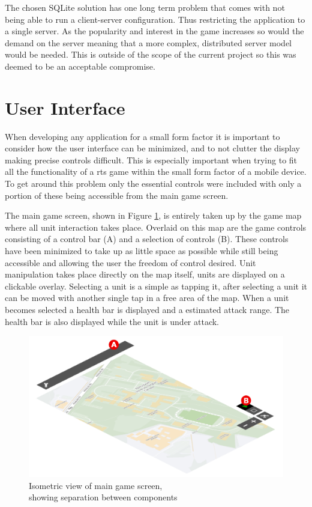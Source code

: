 The chosen SQLite solution has one long term problem that comes with not being able to run a client-server configuration. Thus restricting the application to a single server. As the popularity and interest in the game increases so would the demand on the server meaning that a more complex, distributed server model would be needed. This is outside of the scope of the current project so this was deemed to be an acceptable compromise.

\section{User Interface}
When developing any application for a small form factor it is important to consider how the user interface can be minimized, and to not clutter the display making precise controls difficult. This is especially important when trying to fit all the functionality of a \gls{rts} game within the small form factor of a mobile device. To get around this problem only the essential controls were included with only a portion of these being accessible from the main game screen.

The main game screen, shown in Figure \ref{fig:isogui}, is entirely taken up by the game map where all unit interaction takes place. Overlaid on this map are the game controls consisting of a control bar (A) and a selection of controls (B). These controls have been minimized to take up as little space as possible while still being accessible and allowing the user the freedom of control desired. Unit manipulation takes place directly on the map itself, units are displayed on a clickable overlay. Selecting a unit is a simple as tapping it, after selecting a unit it can be moved with another single tap in a free area of the map. When a unit becomes selected a health bar is displayed and a estimated attack range. The health bar is also displayed while the unit is under attack.

\begin{figure}[H]
  \centering
   \includegraphics[width=1\textwidth]{Images/layout_include.png}
  \caption{Isometric view of main game screen,\\showing separation between components}
  \label{fig:isogui}
\end{figure}
